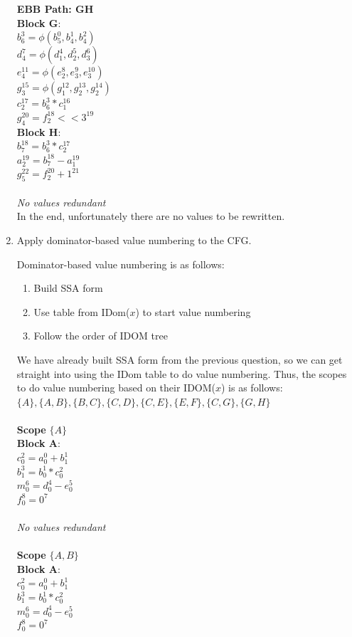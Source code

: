 \documentclass[11pt]{article}
\begin{document}
\begin{enumerate}
\begin{Answer}
		\textbf{EBB Path: GH} \\
		\textbf{Block G}: \\
		$b_6^3 = \phi(b_5^0, b_4^1, b_4^2)$ \\
		$d_4^7 = \phi(d_1^4, d_2^5, d_3^6)$ \\
		$e_4^{11} = \phi(e_2^8, e_3^9, e_3^{10})$ \\
		$g_3^{15} = \phi(g_1^{12}, g_2^{13}, g_2^{14})$ \\
		$c_2^{17} = b_6^3 * c_1^{16}$ \\
		$g_4^{20} = f_2^{18} << 3^{19}$ \\
		\textbf{Block H}: \\
		$b_7^{18} = b_6^3 * c_2^{17}$ \\
		$a_2^{19} = b_7^{18} - a_1^{19}$ \\
		$g_5^{22} = f_2^{20} + 1^{21}$ \\
		\\
		\textit{No values redundant} \\

		In the end, unfortunately there are no values to be rewritten.
		\end{Answer}
	\item Apply dominator-based value numbering to the CFG.
		\begin{Answer}
		Dominator-based value numbering is as follows:
		\begin{enumerate}[i]
			\item Build SSA form
			\item Use table from IDom($x$) to start value numbering
			\item Follow the order of IDOM tree
		\end{enumerate}
		
		We have already built SSA form from the previous question, so we can get straight into using the IDom table to do value numbering. Thus, the scopes to do value numbering based on their IDOM($x$) is as follows:
		$\{A\}, \{A, B\}, \{B, C\}, \{C, D\}, \{C, E\}, \{E, F\}, \{C, G\}, \{G, H\} $
		\\ \\
		\textbf{Scope} $\{A\}$ \\
		\textbf{Block A}: \\
		$c_0^2 = a_0^0 + b_1^1$ \\
		$b_1^3 = b_0^1 * c_0^2$ \\
		$m_0^6 = d_0^4 - e_0^5$ \\
		$f_0^8 = 0^7$ \\
		\\
		\textit{No values redundant} \\ 
		\\
		\textbf{Scope} $\{A, B\}$ \\
		\textbf{Block A}: \\
		$c_0^2 = a_0^0 + b_1^1$ \\
		$b_1^3 = b_0^1 * c_0^2$ \\
		$m_0^6 = d_0^4 - e_0^5$ \\
		$f_0^8 = 0^7$ \\
		

\end{Answer}
\end{enumerate}
\end{document}
